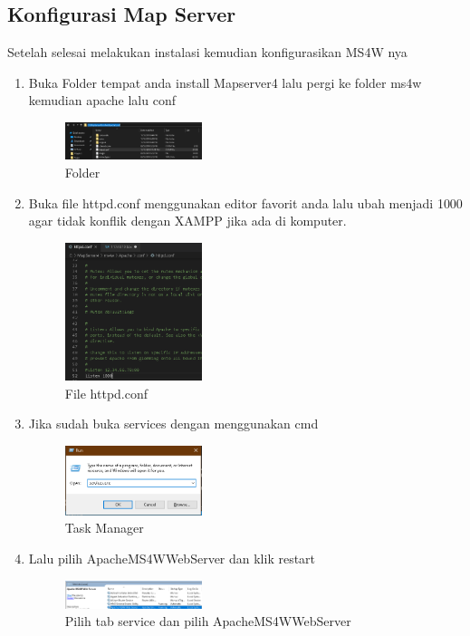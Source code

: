\subsection{Konfigurasi Map Server}
Setelah selesai melakukan instalasi kemudian konfigurasikan MS4W nya
\begin{enumerate}
  \item Buka Folder tempat anda install Mapserver4 lalu pergi ke folder ms4w kemudian apache lalu conf
  \hfill\break
    \begin{figure}[H]
		\includegraphics[width=4cm]{figures/tugas4/1174079/4_Konfigurasi_MS4W.png}
		\centering
		\caption{Folder }
    \end{figure}

  \item Buka file httpd.conf menggunakan editor favorit anda lalu ubah menjadi 1000 agar tidak konflik dengan XAMPP jika ada di komputer.
  \hfill\break
    \begin{figure}[H]
		\includegraphics[width=4cm]{figures/tugas4/1174079/5_Port.png}
		\centering
		\caption{File httpd.conf}
    \end{figure}

  \item Jika sudah buka services dengan menggunakan cmd
  \hfill\break
    \begin{figure}[H]
		\includegraphics[width=4cm]{figures/tugas4/1174079/6_Buka_Services.png}
		\centering
		\caption{Task Manager}
    \end{figure}

  \item Lalu pilih ApacheMS4WWebServer dan klik restart
  \hfill\break
  \begin{figure}[H]
  \includegraphics[width=4cm]{figures/tugas4/1174079/7_restart_MS4W.png}
  \centering
  \caption{Pilih tab service dan pilih ApacheMS4WWebServer}
  \end{figure}

\end{enumerate}

